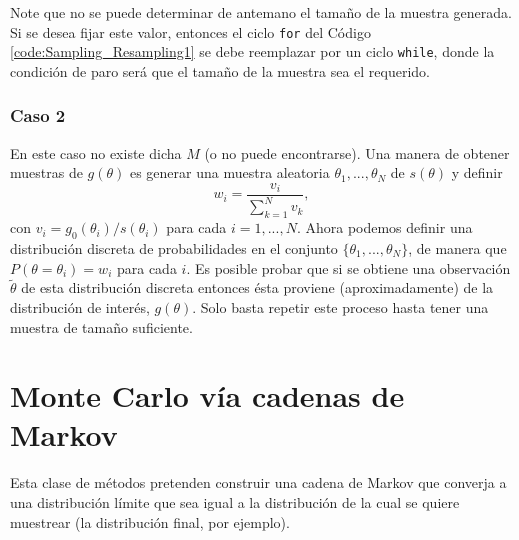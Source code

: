 Note que no se puede determinar de antemano el tamaño de la muestra generada. Si se desea fijar este valor, entonces el ciclo \texttt{for} del Código \ref{code:Sampling_Resampling1} se debe reemplazar por un ciclo \texttt{while}, donde la condición de paro será que el tamaño de la muestra sea el requerido.



\subsubsection*{Caso 2}


En este caso no existe dicha $M$ (o no puede encontrarse). Una manera de obtener muestras de $g(\theta)$ es generar una muestra aleatoria $\theta_1, ..., \theta_N$ de $s(\theta)$ y definir
\begin{equation*}
	w_i = \frac{ v_i }{ \sum_{k=1}^{N} v_k },
\end{equation*}
con $v_i = g_0(\theta_i)/s(\theta_i)$ para cada $i=1,...,N$. Ahora podemos definir una distribución discreta de probabilidades en el conjunto $\{ \theta_1, ...,\theta_N \}$, de manera que $P(\theta = \theta_i) = w_i$ para cada $i$. Es posible probar que si se obtiene una observación $\tilde{\theta}$ de esta distribución discreta entonces ésta proviene (aproximadamente) de la distribución de interés, $g(\theta)$. Solo basta repetir este proceso hasta tener una muestra de tamaño suficiente.





\section{Monte Carlo vía cadenas de Markov}

Esta clase de métodos pretenden construir una cadena de Markov que converja a una distribución límite que sea igual a la distribución de la cual se quiere muestrear (la distribución final, por ejemplo).\\


